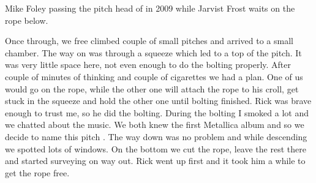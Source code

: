\begin{marginfigure}
\checkoddpage \ifoddpage \forcerectofloat \else \forceversofloat \fi
\centering
 \caption{Mike Foley passing the pitch head of \protect{} in 2009 while Jarvist Frost waits on the rope below. }
 \label{Kill em All Mike}
\end{marginfigure}

Once through, we free climbed couple of small pitches and arrived to a
small chamber. The way on was through a squeeze which led to a top of
the pitch. It was very little space here, not even enough to do the
bolting properly. After couple of minutes of thinking and couple of
cigarettes we had a plan. One of us would go on the rope, while the
other one will attach the rope to his croll, get stuck in the squeeze
and hold the other one until bolting finished. Rick was brave enough to
trust me, so he did the bolting. During the bolting I smoked a lot and
we chatted about the music. We both knew the first Metallica album and
so we decide to name this pitch . The way down was no
problem and while descending we spotted lots of windows. On the bottom
we cut the rope, leave the rest there and started surveying on way out.
Rick went up first and it took him a while to get the rope free. 


